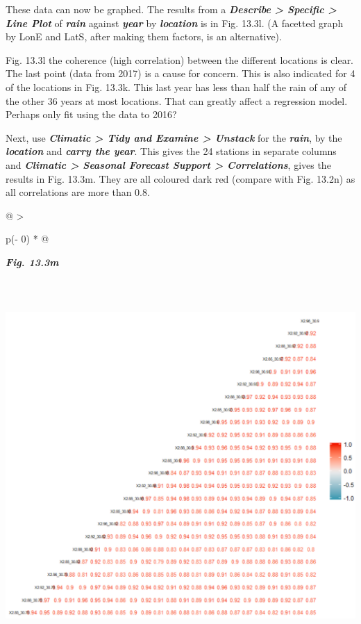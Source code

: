 \documentclass[
  letterpaper,
  DIV=11,
  numbers=noendperiod]{scrreprt}
\begin{document}
These data can now be graphed. The results from a \textbf{\emph{Describe
\textgreater{} Specific \textgreater{} Line Plot}} of
\textbf{\emph{rain}} against \textbf{\emph{year}} by
\textbf{\emph{location}} is in Fig. 13.3l. (A facetted graph by LonE and
LatS, after making them factors, is an alternative).

Fig. 13.3l the coherence (high correlation) between the different
locations is clear. The last point (data from 2017) is a cause for
concern. This is also indicated for 4 of the locations in Fig. 13.3k.
This last year has less than half the rain of any of the other 36 years
at most locations. That can greatly affect a regression model. Perhaps
only fit using the data to 2016?

Next, use \textbf{\emph{Climatic \textgreater{} Tidy and Examine
\textgreater{} Unstack}} for the \textbf{\emph{rain}}, by the
\textbf{\emph{location}} and \textbf{\emph{carry the year}}. This gives
the 24 stations in separate columns and \textbf{\emph{Climatic
\textgreater{} Seasonal Forecast Support \textgreater{} Correlations}},
gives the results in Fig. 13.3m. They are all coloured dark red (compare
with Fig. 13.2n) as all correlations are more than 0.8.

\begin{longtable}[]{@{}
  >{\raggedright\arraybackslash}p{(\columnwidth - 0\tabcolsep) * }@{}}
\toprule\noalign{}
\begin{minipage}[b]{\linewidth}\raggedright
\textbf{\emph{Fig. 13.3m}}
\end{minipage} \\
\midrule\noalign{}
\endhead
\bottomrule\noalign{}
\endlastfoot
\includegraphics[width=5.90613in,height=5.16868in]{figures/Fig13.3m.png} \\
\end{longtable}
\end{document}
